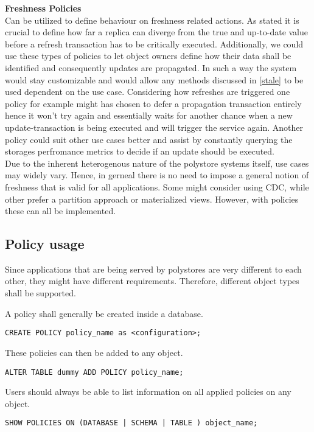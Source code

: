 \textbf{Freshness Policies}\\
Can be utilized to define behaviour on freshness related actions. As \cite{fekete:2018} stated it is crucial to define how far a replica can diverge from the true
and up-to-date value before a refresh transaction has to be critically executed.
Additionally, we could use these types of policies to let object owners define how their data shall be identified and consequently updates are propagated.
In such a way the system would stay customizable and would allow any methods discussed in \ref{stale} to be used dependent on the use case.
Considering how refreshes are triggered one policy for example might has chosen to defer a propagation transaction entirely hence it won't try again and
essentially waits for another chance when a new update-transaction is being executed and will trigger the service again. Another policy could suit other use cases better 
and assist by constantly querying the storages perfromance metrics to decide if an update should be executed.\\

Due to the inherent heterogenous nature of the polystore systems itself, use cases may widely vary. Hence, in gerneal there is no need to impose a 
general notion of freshness that is valid for all applications. Some might consider using CDC, while other prefer a partition approach or materialized views.
However, with policies these can all be implemented.\\


\subsection{Policy usage}

Since applications that are being served by polystores are very different to each other, they might have different requirements. 
Therefore, different object types shall be supported.

A policy shall generally be created inside a database.
\begin{verbatim}
CREATE POLICY policy_name as <configuration>;
\end{verbatim}

These policies can then be added to any object.
\begin{verbatim}
ALTER TABLE dummy ADD POLICY policy_name;
\end{verbatim}

Users should always be able to list information on all applied policies on any object.
\begin{verbatim}
SHOW POLICIES ON (DATABASE | SCHEMA | TABLE ) object_name;
\end{verbatim}


